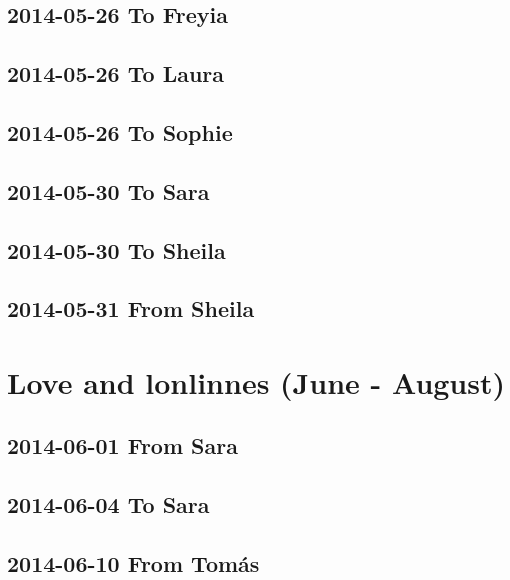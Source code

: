 \documentclass[]{book}
\begin{document}
\hypertarget{to-freyia}{%
\section{2014-05-26 To Freyia}\label{to-freyia}}

\hypertarget{to-laura-1}{%
\section{2014-05-26 To Laura}\label{to-laura-1}}

\hypertarget{to-sophie}{%
\section{2014-05-26 To Sophie}\label{to-sophie}}

\hypertarget{to-sara}{%
\section{2014-05-30 To Sara}\label{to-sara}}

\hypertarget{to-sheila-2}{%
\section{2014-05-30 To Sheila}\label{to-sheila-2}}

\hypertarget{from-sheila-1}{%
\section{2014-05-31 From Sheila}\label{from-sheila-1}}

\hypertarget{love}{%
\chapter{Love and lonlinnes (June - August)}\label{love}}

\hypertarget{from-sara}{%
\section{2014-06-01 From Sara}\label{from-sara}}

\hypertarget{to-sara-1}{%
\section{2014-06-04 To Sara}\label{to-sara-1}}

\hypertarget{from-tomas-5}{%
\section{2014-06-10 From Tomás}\label{from-tomas-5}}
\end{document}
